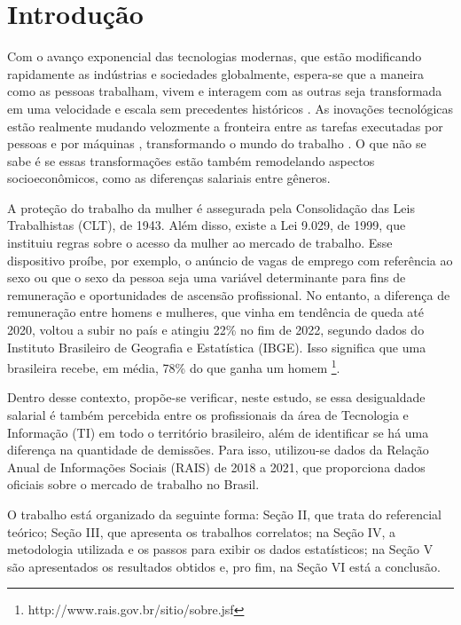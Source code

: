 \section{Introdução}

Com o avanço exponencial das tecnologias modernas, que estão modificando rapidamente as indústrias e sociedades globalmente, espera-se que a maneira como as pessoas trabalham, vivem e interagem com as outras seja transformada em uma velocidade e escala sem precedentes históricos \cite{hand1981artificial}. As inovações tecnológicas estão realmente mudando velozmente a fronteira entre as tarefas executadas por pessoas e por máquinas , transformando o mundo do trabalho \cite{aksoy2021robots}. O que não se sabe é se essas transformações estão também remodelando aspectos socioeconômicos, como as diferenças salariais entre gêneros.

A proteção do trabalho da mulher é assegurada pela Consolidação das Leis Trabalhistas (CLT), de 1943. Além disso, existe a Lei 9.029, de 1999, que instituiu regras sobre o acesso da mulher ao mercado de trabalho. Esse dispositivo proíbe, por exemplo, o anúncio de vagas de emprego com referência ao sexo ou que o sexo da pessoa seja uma variável determinante para fins de remuneração e oportunidades de ascensão profissional. No entanto, a diferença de remuneração entre homens e mulheres, que vinha em tendência de queda até 2020, voltou a subir no país e atingiu 22\% no fim de 2022, segundo dados do Instituto Brasileiro de Geografia e Estatística (IBGE). Isso significa que uma brasileira recebe, em média, 78\% do que ganha um homem \footnote{http://www.rais.gov.br/sitio/sobre.jsf}.

Dentro desse contexto, propõe-se verificar, neste estudo, se essa desigualdade salarial é também percebida entre os profissionais da área de Tecnologia e Informação (TI) em todo o território brasileiro, além de identificar se há uma diferença na quantidade de demissões. Para isso, utilizou-se dados da Relação Anual de Informações Sociais (RAIS) de 2018 a 2021, que proporciona dados oficiais sobre o mercado de trabalho no Brasil. 

O trabalho está organizado da seguinte forma: Seção II, que trata do referencial teórico; Seção III, que apresenta os trabalhos correlatos; na Seção IV, a metodologia utilizada e os passos para exibir os dados estatísticos; na Seção V são apresentados os resultados obtidos e, pro fim, na Seção VI está a conclusão.